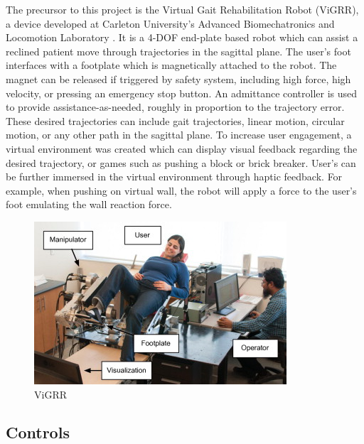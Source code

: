 \documentclass[12pt]{report}
\begin{document}
	
	The precursor to this project is the Virtual Gait Rehabilitation Robot (ViGRR), a device developed at Carleton University's Advanced Biomechatronics and Locomotion Laboratory \cite{Chisholm2014, Chisholm2010}. It is a 4-DOF end-plate based robot which can assist a reclined patient move through trajectories in the sagittal plane. The user's foot interfaces with a footplate which is magnetically attached to the robot. The magnet can be released if triggered by safety system, including high force, high velocity, or pressing an emergency stop button. An admittance controller is used to provide assistance-as-needed, roughly in proportion to the trajectory error. These desired trajectories can include gait trajectories, linear motion, circular motion, or any other path in the sagittal plane. To increase user engagement, a virtual environment was created which can display visual feedback regarding the desired trajectory, or games such as pushing a block or brick breaker. User's can be further immersed in the virtual environment through haptic feedback. For example, when pushing on virtual wall, the robot will apply a force to the user's foot emulating the wall reaction force. 
	
	
	\begin{figure}[t] 
		\centering
		\includegraphics[width=0.75\linewidth]{Vigrr}
		\caption{ViGRR}
		\label{fig:vigrr}
	\end{figure}	
	
	

	
	
	\subsection{Controls} 
	
\end{document}
